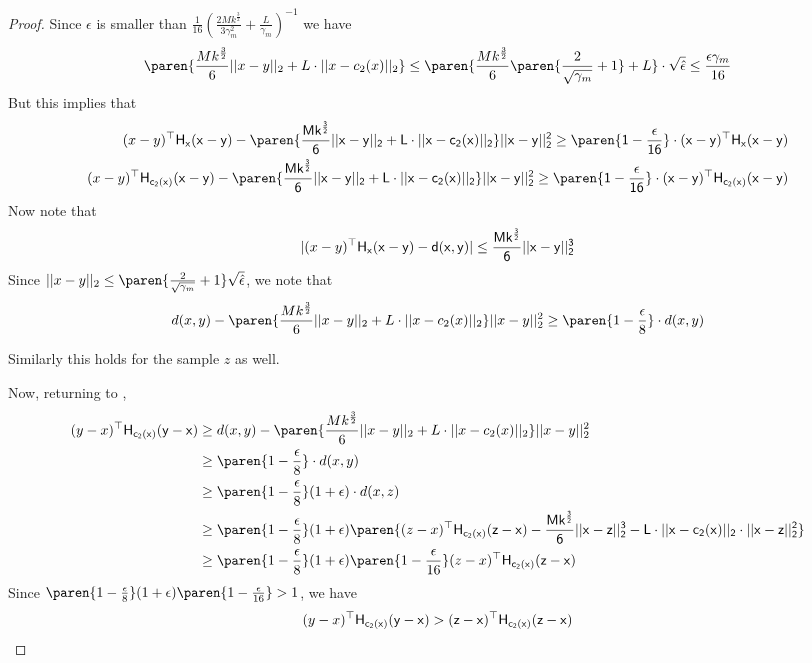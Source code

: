 \begin{proof}
    Since $\epsilon$ is smaller than $\frac{1}{16}(\frac{2M k^{\frac{3}{2}}}{3\gamma_m^2} + \frac{L}{\gamma_m})^{-1}$ we have 
    \begin{align*}
        \paren{\frac{M k^{\frac{3}{2}}}{6}||x - y||_2 + L\cdot ||x - c_2(x)||_2} \le \paren{\frac{M k^{\frac{3}{2}}}{6}\paren{\frac{2}{\sqrt{\gamma_m}} + 1} + L}\cdot \sqrt{\hat{\epsilon}} \le \frac{\epsilon\gamma_m}{16}
    \end{align*}
    But this implies that 
    \begin{align*}
        (x-y)^{\top}\sf{H}_{x}(x-y) -\paren{\frac{M k^{\frac{3}{2}}}{6}||x - y||_2 + L\cdot ||x - c_2(x)||_2} ||x - y||_2^2 \ge \paren{1 - \frac{\epsilon}{16}}\cdot (x-y)^{\top}\sf{H}_{x}(x-y)\\
        (x-y)^{\top}\sf{H}_{c_2(x)}(x-y) -\paren{\frac{M k^{\frac{3}{2}}}{6}||x - y||_2 + L\cdot ||x - c_2(x)||_2} ||x - y||_2^2 \ge \paren{1 - \frac{\epsilon}{16}}\cdot (x-y)^{\top}\sf{H}_{c_2(x)}(x-y)
    \end{align*}
    Now note that 
    \begin{align*}
        |(x-y)^{\top}\sf{H}_{x}(x-y) - d(x,y)| \le \frac{M k^{\frac{3}{2}}}{6}||x - y||_2^3
    \end{align*}
    Since $||x - y||_2 \le \paren{\frac{2}{\sqrt{\gamma_m}} + 1}\sqrt{\hat{\epsilon}}$, we note that  
    \begin{align*}
        d(x,y) -\paren{\frac{M k^{\frac{3}{2}}}{6}||x - y||_2 + L\cdot ||x - c_2(x)||_2} ||x - y||_2^2 \ge \paren{1 - \frac{\epsilon}{8}}\cdot d(x,y)
    \end{align*}

    
    Similarly this holds for the sample $z$ as well.
    
    Now, returning to ,
    \begin{align}
        (y - x)^{\top}\sf{H}_{c_2(x)}(y - x) &\ge d(x,y) -\paren{\frac{M k^{\frac{3}{2}}}{6}||x - y||_2 + L\cdot ||x - c_2(x)||_2} ||x - y||_2^2 \\
        &\ge \paren{1 - \frac{\epsilon}{8}}\cdot d(x,y)\\
        &\ge \paren{1 - \frac{\epsilon}{8}} (1 + \epsilon)\cdot d(x,z)\\
        & \ge \paren{1 - \frac{\epsilon}{8}} (1 + \epsilon) \paren{(z - x)^{\top}\sf{H}_{c_2(x)}(z - x) - \frac{M k^{\frac{3}{2}}}{6}||x - z||_2^3 - L\cdot ||x - c_2(x)||_2\cdot ||x - z||_2^2}\\
        &\ge \paren{1 - \frac{\epsilon}{8}} (1 + \epsilon)\paren{1 - \frac{\epsilon}{16}} (z - x)^{\top}\sf{H}_{c_2(x)}(z - x)
    \end{align}
    Since $\paren{1 - \frac{\epsilon}{8}} (1 + \epsilon)\paren{1 - \frac{\epsilon}{16}} > 1$, we have 
    \begin{align*}
        (y - x)^{\top}\sf{H}_{c_2(x)}(y - x) > (z - x)^{\top}\sf{H}_{c_2(x)}(z - x)
    \end{align*}
    
\end{proof}
    

    \newpage
   